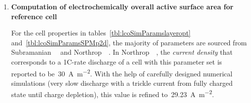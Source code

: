 \begin{enumerate}[ label=\textbf{\arabic*}), leftmargin=0pt, itemindent=20pt, labelwidth=15pt, labelsep=5pt, listparindent=0.7cm, align=left]
\begin{itemize}[ leftmargin=10pt, itemindent=15pt, labelwidth=5pt, labelsep=5pt, listparindent=0.7cm, align=left]
                In  this  layer  optimisation work,  following  the  assumptions
                of    \cref{subsec:layeroptassumptions},   the    overall   pack
                configuration remains  unchanged \ie~independent of  number of
                layers  within the  pouch.  This implies  that the  undervoltage
                threshold  for  DC  bus   voltage  throughout  this  work  shall
                remain  fixed  at~\SI{336}{\volt}.  Therefore,  with  96~series
                connected cells  in a string,  the lower cut-off voltage  for an
                individual  cell  is~\textbf{\SI{3.5}{\volt}}.  This  value  is
                reported  in \cref{tbl:lcoSimParamslayeropt}  and is  used as  a
                termination  condition  for  all  simulations  as  explained  in
                \cref{sec:layeroptframework}.

        \end{itemize}

    \item \textbf{Computation of electrochemically overall active surface area for reference cell}

        For   the  cell   properties  in   tables~\ref{tbl:lcoSimParamslayeropt}
        and~\ref{tbl:lcoSimParamsSPMp2d},    the    majority    of    parameters
        are      sourced      from      Subramanian~\etal~\cite{Subramanian2009}
        and                Northrop~\etal~\cite{Northrop2011}.                In
        Northrop~\etal~\cite{Northrop2011},  the   \emph{current  density}  that
        corresponds to a 1C-rate discharge of  a cell with this parameter set is
        reported to be~\approx\SI{30}{\ampere\per\meter\squared}. With the help
        of carefully designed numerical simulations  (very slow discharge with a
        trickle current from  fully charged state until  charge depletion), this
        value is refined to~\SI{29.23}{\ampere\per\meter\squared}.


\end{enumerate}
